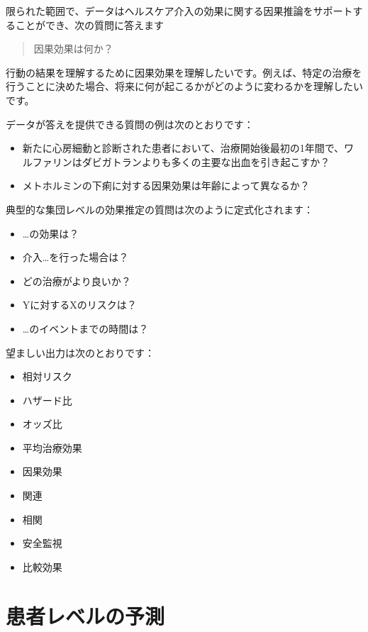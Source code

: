 \documentclass[
  11pt]{book}
\providecommand{\tightlist}{%
  \setlength{\itemsep}{0pt}\setlength{\parskip}{0pt}}
\theoremstyle{definition}
\theoremstyle{definition}
\theoremstyle{definition}
\theoremstyle{definition}
\theoremstyle{remark}
\begin{document}

限られた範囲で、データはヘルスケア介入の効果に関する因果推論をサポートすることができ、次の質問に答えます

\begin{quote}
因果効果は何か？
\end{quote}

行動の結果を理解するために因果効果を理解したいです。例えば、特定の治療を行うことに決めた場合、将来に何が起こるかがどのように変わるかを理解したいです。

データが答えを提供できる質問の例は次のとおりです：

\begin{itemize}
\tightlist
\item
  新たに心房細動と診断された患者において、治療開始後最初の1年間で、ワルファリンはダビガトランよりも多くの主要な出血を引き起こすか？
\item
  メトホルミンの下痢に対する因果効果は年齢によって異なるか？
\end{itemize}

典型的な集団レベルの効果推定の質問は次のように定式化されます：

\begin{itemize}
\tightlist
\item
  \ldots の効果は？
\item
  介入\ldots を行った場合は？
\item
  どの治療がより良いか？
\item
  Yに対するXのリスクは？
\item
  \ldots のイベントまでの時間は？
\end{itemize}

望ましい出力は次のとおりです：

\begin{itemize}
\tightlist
\item
  相対リスク
\item
  ハザード比
\item
  オッズ比
\item
  平均治療効果
\item
  因果効果
\item
  関連
\item
  相関
\item
  安全監視
\item
  比較効果
\end{itemize}

\section{患者レベルの予測}\label{ux60a3ux8005ux30ecux30d9ux30ebux306eux4e88ux6e2c}
\end{document}
